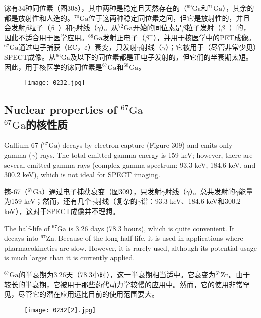 \documentclass[dvipsnames, svgnames,a4paper,11pt]{article}
\begin{document}
镓有34种同位素（图308），其中两种是稳定且天然存在的（\(\mathrm{^{69}Ga}\)和\(\mathrm{^{71}Ga}\)），其余的都是放射性和人造的。\(\mathrm{^{70}Ga}\)位于这两种稳定同位素之间，但它是放射性的，并且会发射\(\beta\)粒子（\(\beta^-\)）和$\gamma$射线（\(\gamma\)）。从\(\mathrm{^{72}Ga}\)开始的同位素是\(\beta\)粒子发射（\(\beta^-\)）的，因此不适合用于医学应用。\(\mathrm{^{68}Ga}\)发射正电子（\(\beta^+\)），并用于核医学中的PET成像。\(\mathrm{^{67}Ga}\)通过电子捕获（EC，\(\varepsilon\)）衰变，只发射$\gamma$射线（\(\gamma\)）；它被用于（尽管非常少见）SPECT成像。从\(\mathrm{^{66}Ga}\)及以下的同位素都是正电子发射的，但它们的半衰期太短。因此，用于核医学的镓同位素是\(\mathrm{^{67}Ga}\)和\(\mathrm{^{68}Ga}\)。

\begin{figure}[h]
	\centering
    \texttt{[image: 0232.jpg]}  
     \label{fig308}
\end{figure}


\subsection{Nuclear properties of \(\mathrm{^{67}Ga}\)\\ \(\mathrm{^{67}Ga}\)的核性质}  
Gallium-67 (\(\mathrm{^{67}Ga}\)) decays by electron capture (Figure 309) and emits only gamma (\(\gamma\)) rays. The total emitted gamma energy is 159 keV; however, there are several emitted gamma rays (complex gamma spectrum: 93.3 keV, 184.6 keV, and 300.2 keV), which is not ideal for SPECT imaging.

镓-67（\(\mathrm{^{67}Ga}\)）通过电子捕获衰变（图309），只发射$\gamma$射线（\(\gamma\)）。总共发射的$\gamma$能量为159 keV；然而，还有几个$\gamma$射线（复杂的$\gamma$谱：93.3 keV、184.6 keV和300.2 keV），这对于SPECT成像并不理想。

The half-life of \(\mathrm{^{67}Ga}\) is 3.26 days (78.3 hours), which is quite convenient. It decays into \(\mathrm{^{67}Zn}\). Because of the long half-life, it is used in applications where pharmacokinetics are slow. However, it is rarely used, although its potential usage is much larger than it is currently applied.

\(\mathrm{^{67}Ga}\)的半衰期为3.26天（78.3小时），这一半衰期相当适中。它衰变为\(\mathrm{^{67}Zn}\)。由于较长的半衰期，它被用于那些药代动力学较慢的应用中。然而，它的使用非常罕见，尽管它的潜在应用远比目前的使用范围要大。

\begin{figure}[h]
	\centering
    \texttt{[image: 0232[2].jpg]}  
     \label{fig309}
\end{figure}
\end{document}
